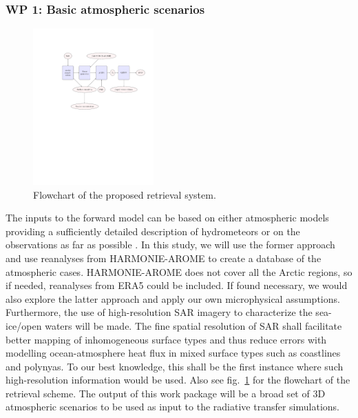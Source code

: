 \documentclass[12pt,oneside,a4paper]{article}
\begin{document}
\subsubsection*{WP 1: Basic atmospheric scenarios}
%
\begin{figure}[t]
	\centering
	\includegraphics[trim=140 370 40 125,clip,height = 60mm]{flowchart.pdf} 
	\caption{Flowchart of the proposed retrieval system.}
	\label{fig:flowchart}
\end{figure}
\label{sec:atmscenes}
The inputs to the forward model can be based on either atmospheric models providing a sufficiently detailed description of hydrometeors or on the observations as far as possible \citep{ekelund:using:20}. In this study, we will use the former approach and use reanalyses from HARMONIE-AROME to create a database of the atmospheric cases. HARMONIE-AROME does not cover all the Arctic regions, so if needed, reanalyses from ERA5 could be included. If found necessary, we would also explore the latter approach and apply our own microphysical assumptions. Furthermore, the use of high-resolution SAR imagery to characterize the sea-ice/open waters will be made. The fine spatial resolution of SAR shall facilitate better mapping of inhomogeneous surface types and thus reduce errors with modelling ocean-atmosphere heat flux in mixed surface types such as coastlines and polynyas. To our best knowledge, this shall be the first instance where such high-resolution information would be used. Also see fig.~\ref{fig:flowchart} for the flowchart of the retrieval scheme.
The output of this work package will be a broad set of 3D atmospheric scenarios to be used as input to the radiative transfer simulations.
\end{document}
